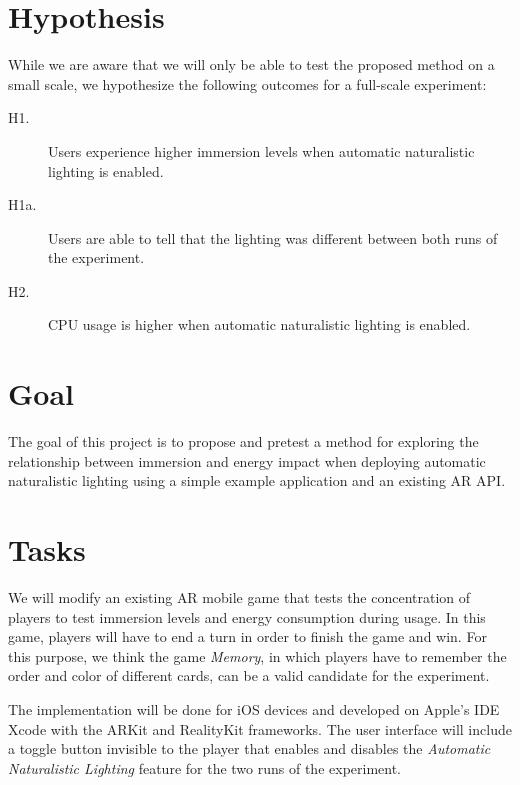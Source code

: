 \documentclass[12pt,twoside,english]{article}
\begin{document}
\section{Hypothesis}
\label{sect:hypothesis}

While we are aware that we will only be able to test the proposed method on a small scale, we hypothesize the following outcomes for a full-scale experiment:

\begin{description}
    \item[H1.] Users experience higher immersion levels when automatic naturalistic lighting is enabled.
    \item[H1a.] Users are able to tell that the lighting was different between both runs of the experiment.
    \item[H2.] \gls{CPU} usage is higher when automatic naturalistic lighting is enabled.
\end{description}





\section{Goal}
\label{sect:goals}

The goal of this project is to propose and pretest a method for exploring the relationship between immersion and energy impact when deploying automatic naturalistic lighting using a simple example application and an existing \gls{AR} \gls{API}.

\section{Tasks}
\label{sect:tasks}

We will modify an existing \gls{AR} mobile game that tests the concentration of players to test immersion levels and energy consumption during usage.
In this game, players will have to end a turn in order to finish the game and win.
For this purpose, we think the game \textit{Memory}, in which players have to remember the order and color of different cards, can be a valid candidate for the experiment.

The implementation will be done for iOS devices and developed on Apple's IDE Xcode with the ARKit and RealityKit frameworks.
The user interface will include a toggle button invisible to the player that enables and disables the \emph{Automatic Naturalistic Lighting} feature for the two runs of the experiment.
\end{document}

